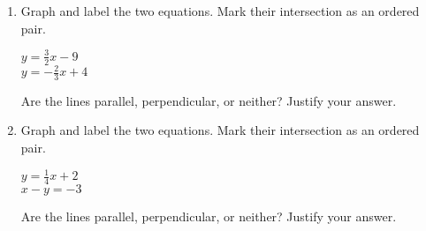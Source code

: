 \documentclass[12pt, twoside]{article}
\begin{document}
\begin{enumerate}
  \item Graph and label the two equations. Mark their intersection as an ordered pair.
    \begin{multicols}{2}
      $y = \frac{3}{2}x-9$ \\
      $y = -\frac{2}{3}x+4$
    \end{multicols}     \vspace{2cm}
    Are the lines parallel, perpendicular, or neither? Justify your answer.
    \vspace{2cm}

    \begin{center} %
    \end{center}

\newpage

  \item Graph and label the two equations. Mark their intersection as an ordered pair.
    \begin{multicols}{2}
      $y = \frac{1}{4}x+2$ \\
      $x-y = -3$
    \end{multicols}     \vspace{2cm}
    Are the lines parallel, perpendicular, or neither? Justify your answer.
    \vspace{2cm}

    \begin{center} %
    \end{center}

\end{enumerate}
\end{document}
